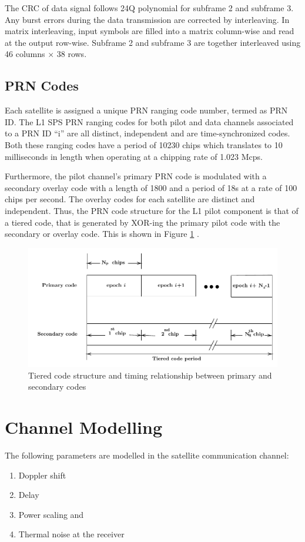 \documentclass[conference]{IEEEtran}
\begin{document}
The CRC of data signal follows 24Q polynomial for subframe 2 and subframe 3. Any burst errors during the 
data transmission are corrected by interleaving. In matrix interleaving, input symbols are filled into a matrix 
column-wise and read at the output row-wise. Subframe 2 and subframe 3 are together interleaved using  
46 columns $\times$ 38 rows.

\subsection{PRN Codes}
Each satellite is assigned a unique PRN ranging code number, termed as PRN ID. The L1 SPS PRN 
ranging codes for both pilot and data channels associated
to a PRN ID “i” are all distinct, independent and are time-synchronized codes. 
Both these ranging codes have a period of 10230 chips which translates to 10 milliseconds
in length when operating at a chipping rate of 1.023 Mcps. 

Furthermore, the pilot channel's primary PRN code is modulated with a secondary overlay code 
with a length of 1800 and a period of 18s at a rate of 100 chips per second. The overlay codes 
for each satellite are distinct and independent. Thus, the PRN code structure for the L1 pilot 
component is that of a tiered code, that is generated by XOR-ing the primary pilot code 
with the secondary or overlay code. This is shown in Figure \ref{fig:R0_IZ4} \cite{b2}.

\begin{figure}[ht]
    \centering
    \includegraphics[width=\columnwidth]{figs/tiered_code}
    \centering
    \caption{Tiered code structure and timing relationship between primary and secondary codes}
    \label{fig:R0_IZ4}
\end{figure}
\section{Channel Modelling}
The following parameters are modelled in the satellite communication channel:
\begin{enumerate}
   \item Doppler shift
   \item Delay 
   \item Power scaling and 
   \item Thermal noise at the receiver
\end{enumerate}
\end{document}
